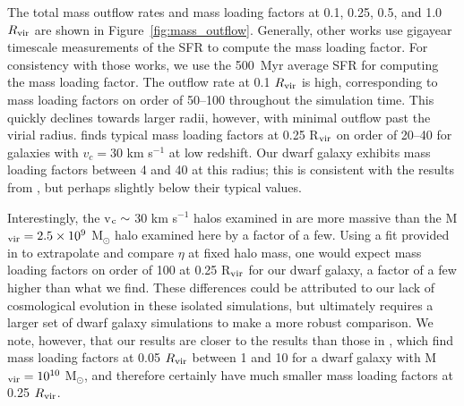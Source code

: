 \documentclass[twocolumn]{aastex61}
\begin{document}
The total mass outflow rates and mass loading factors at 0.1, 0.25, 0.5, and 1.0 $R_{\rm vir}$ are shown in Figure~\ref{fig:mass_outflow}. Generally, other works use gigayear timescale measurements of the SFR to compute the mass loading factor. For consistency with those works, we use the 500~Myr average SFR for computing the mass loading factor. The outflow rate at 0.1 $R_{\rm vir}$ is high, corresponding to mass loading factors on order of 50--100 throughout the simulation time. This quickly declines towards larger radii, however, with minimal outflow past the virial radius. \citet{Muratov2015} finds typical mass loading factors at 0.25 R$_{\rm vir}$ on order of 20--40 for galaxies with $v_{c} = 30$ km s$^{-1}$ at low redshift. Our dwarf galaxy exhibits mass loading factors between 4 and 40 at this radius; this is consistent with the results from \citet{Muratov2015}, but perhaps slightly below their typical values. 

Interestingly, the v$_{\rm c}\sim$ 30 km s$^{-1}$ halos examined in \citet{Muratov2015} are more massive than the M$_{\rm vir} = 2.5\times 10^9$ M$_{\odot}$ halo examined here by a factor of a few. Using a fit provided in \citet{Muratov2015} to extrapolate and compare $\eta$ at fixed halo mass, one would expect mass loading factors on order of 100 at 0.25 R$_{\rm vir}$ for our dwarf galaxy, a factor of a few higher than what we find. These differences could be attributed to our lack of cosmological evolution in these isolated simulations, but ultimately requires a larger set of dwarf galaxy simulations to make a more robust comparison. We note, however, that our results are closer to the \citep{Muratov2015} results than those in \citet{Hu2016,Hu2017}, which find mass loading factors at 0.05 $R_{\rm vir}$ between 1 and 10 for a dwarf galaxy with M$_{\rm vir} = 10^{10}$ M$_{\odot}$, and therefore certainly have much smaller mass loading factors at 0.25 $R_{\rm vir}$.
\end{document}
